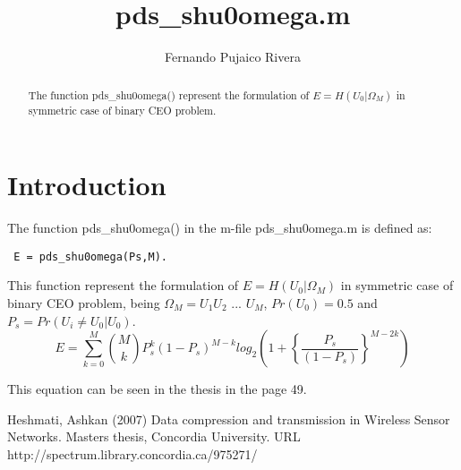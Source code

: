 \documentclass[a4paper,10pt]{article}
\title{pds\_shu0omega.m}
\author{Fernando Pujaico Rivera}
\begin{document}
\maketitle
\begin{abstract}
The function pds\_shu0omega() represent the formulation of $E = H(U_0|\Omega_M)$ 
in symmetric case of binary CEO problem.
\end{abstract}

\section{Introduction}
The function pds\_shu0omega() in the m-file pds\_shu0omega.m is defined as:
\lstset{language=octave}%
\begin{lstlisting}
 E = pds_shu0omega(Ps,M).
\end{lstlisting}
This function represent the formulation of $E=H(U_0|\Omega_M)$ in symmetric case 
of binary CEO problem,
being $\Omega_M=U_1 U_2$ $ ...$ $ U_M$, $Pr(U_0)=0.5$ and $P_s = Pr(U_i \neq U_0|U_0)$.
\begin{equation}
 E = \sum_{k=0}^M \binom{M}{k} P_s^k (1-P_s)^{M-k} log_2\left ( 1 +  \left\{\frac{P_s}{(1-P_s)}\right\}^{M-2k} \right )
\end{equation}

This equation can be seen in the thesis \cite{shu0omega} in the page 49.

\begin{thebibliography}{99}
 
  Heshmati, Ashkan   (2007) Data compression and transmission in Wireless Sensor Networks.  
  Masters thesis, Concordia University. URL http://spectrum.library.concordia.ca/975271/ 

\end{thebibliography}  
\end{document}
